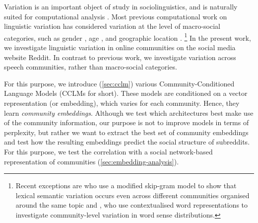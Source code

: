 \documentclass[11pt]{article}
\begin{document}
Variation is an important object of study in sociolinguistics,
and is naturally suited for computational analysis \citep{Nguyen2016}.
Most previous computational work on linguistic variation 
has considered variation at the level of macro-social categories, such as gender
\citep{Burger2011,Ciot2013,Bamman2014}, age \citep{Nguyen2013}, and
geographic location \citep{Eisenstein2010,Bamman2014a}.%
\footnote{Recent exceptions are \citet{DelTredici2017} who use a modified
skip-gram model to show that lexical semantic variation occurs even across 
different communities organised around the same topic and 
\citet{Lucy2021}, who use contextualised word representations to
investigate community-level variation in word sense distributions.}
In the present work, we investigate linguistic variation
in online communities on the social media website Reddit. 
In contrast to previous work, we investigate variation across 
speech communities, rather than macro-social categories.


%  
%
%

For this purpose, we introduce (\cref{sec:cclm}) various
Community-Conditioned Language Models (CCLMs for short). These models
are conditioned on a vector representation (or embedding), which
varies for each community. Hence, they learn \emph{community
  embeddings}.  Although we test which architectures best make use
of the community information, our purpose is not to improve models in
terms of perplexity, but rather we want to extract the best set of
community embeddings and test how the resulting embeddings
predict the social structure of subreddits. For this purpose, we test
the correlation with a social network-based representation of
communities (\cref{sec:embedding-analysis}).


\end{document}
